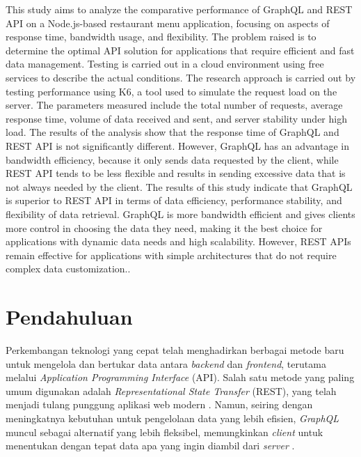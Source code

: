 \documentclass[
 manuscript=article,  %
  layout=publish, 
  year=2024, 
  month= Februari, %
  volume=8,
  number=1 
]{JIKO}
\begin{document}
\begin{abstracting}
This study aims to analyze the comparative performance of GraphQL and REST API on a Node.js-based restaurant menu application, focusing on aspects of response time, bandwidth usage, and flexibility. The problem raised is to determine the optimal API solution for applications that require efficient and fast data management. Testing is carried out in a cloud environment using free services to describe the actual conditions. The research approach is carried out by testing performance using K6, a tool used to simulate the request load on the server. The parameters measured include the total number of requests, average response time, volume of data received and sent, and server stability under high load. The results of the analysis show that the response time of GraphQL and REST API is not significantly different. However, GraphQL has an advantage in bandwidth efficiency, because it only sends data requested by the client, while REST API tends to be less flexible and results in sending excessive data that is not always needed by the client. The results of this study indicate that GraphQL is superior to REST API in terms of data efficiency, performance stability, and flexibility of data retrieval. GraphQL is more bandwidth efficient and gives clients more control in choosing the data they need, making it the best choice for applications with dynamic data needs and high scalability. However, REST APIs remain effective for applications with simple architectures that do not require complex data customization..
\end{abstracting}

\section{Pendahuluan}
Perkembangan teknologi yang cepat telah menghadirkan berbagai metode baru untuk mengelola dan bertukar data antara \textit{backend} dan \textit{frontend}, terutama melalui \textit{Application Programming Interface} (API). Salah satu metode yang paling umum digunakan adalah \textit{Representational State Transfer} (REST), yang telah menjadi tulang punggung aplikasi web modern \cite{[1]}. Namun, seiring dengan meningkatnya kebutuhan untuk pengelolaan data yang lebih efisien, \textit{GraphQL} muncul sebagai alternatif yang lebih fleksibel, memungkinkan \textit{client} untuk menentukan dengan tepat data apa yang ingin diambil dari \textit{server} \cite{[2]}.
\end{document}
